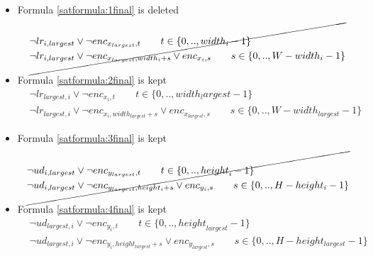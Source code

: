 \begin{itemize}
    \item Formula \ref{satformula:1final} is deleted
        \begin{equation*}
            \cancel{
        \begin{aligned}
            &\neg lr_{i,largest} \vee \neg {enc}_{x_{largest},t} \qquad t \in \{ 0,.., {width}_i -1\}
            \\
            &\neg lr_{i,largest} \vee \neg {enc}_{x_{largest},{width}_i+s} \vee {enc}_{x_{i},s} \qquad s \in \{ 0,.., W-{width}_i-1\}
        \end{aligned}
        }
        \end{equation*}
    \item Formula \ref{satformula:2final} is kept
        \begin{equation*}
        \begin{aligned}
            &\neg lr_{largest,i} \vee \neg {enc}_{x_{i},t} \qquad t \in \{ 0,.., {width}_largest -1\}
            \\
            &\neg lr_{largest,i} \vee \neg {enc}_{x_{i},{width}_{largest}+s} \vee {enc}_{x_{largest},s} \qquad s \in \{ 0,.., W-{width}_{largest}-1\}
        \end{aligned}
        \end{equation*}

    \item Formula \ref{satformula:3final} is kept
        \begin{equation*}
        \cancel{
        \begin{aligned}
            &\neg ud_{i,largest} \vee \neg{enc}_{y_{largest},t} \qquad t \in \{ 0,.., {height}_i -1\}
            \\
            &\neg ud_{i,largest} \vee \neg {enc}_{y_{largest},height_{i}+s} \vee enc_{y_{i},s} \qquad s \in \{ 0,.., H-height_i-1\}
        \end{aligned}
        }
        \end{equation*}

    \item Formula \ref{satformula:4final} is kept
        \begin{equation*}
        \begin{aligned}
            &\neg ud_{largest,i} \vee \neg{enc}_{y_{i},t} \qquad t \in \{ 0,.., {height}_{largest} -1\}
            \\
            &\neg ud_{largest,i} \vee \neg {enc}_{y_{i},height_{largest}+s} \vee enc_{y_{largest},s} \qquad s \in \{ 0,.., H-height_{largest}-1\}
        \end{aligned}
        \end{equation*}
\end{itemize}

